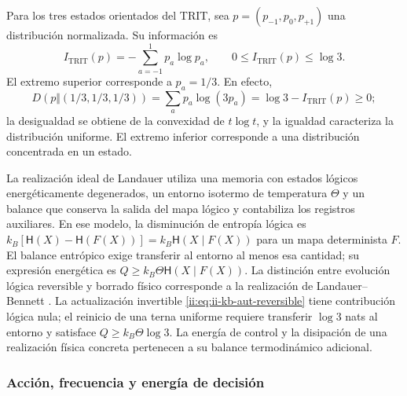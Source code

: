 Para los tres estados orientados del TRIT, sea
\(p=(p_{-1},p_0,p_{+1})\) una distribución normalizada. Su información es
\begin{equation}
 I_{\mathrm{TRIT}}(p)=-\sum_{a=-1}^{1}p_a\log p_a,
 \qquad 0\leq I_{\mathrm{TRIT}}(p)\leq\log3.
 \label{ii:eq:ii-kb-aut-trit}
\end{equation}
El extremo superior corresponde a \(p_a=1/3\). En efecto,
\[
 D(p\Vert(1/3,1/3,1/3))
 =\sum_ap_a\log(3p_a)=\log3-I_{\mathrm{TRIT}}(p)\geq0;
\]
la desigualdad se obtiene de la convexidad de \(t\log t\), y la
igualdad caracteriza la distribución uniforme. El extremo inferior
corresponde a una distribución concentrada en un estado.

La realización ideal de Landauer utiliza una memoria con estados lógicos
energéticamente degenerados, un entorno isotermo de temperatura \(\Theta\)
y un balance que conserva la salida del mapa lógico y contabiliza los
registros auxiliares. En ese modelo, la disminución de entropía lógica es
\(k_B[\mathsf H(X)-\mathsf H(F(X))]
=k_B\mathsf H(X\mid F(X))\) para un mapa determinista \(F\).
El balance entrópico exige transferir al entorno al menos esa cantidad;
su expresión energética es \(Q\geq k_B\Theta\mathsf H(X\mid F(X))\).
La distinción entre evolución lógica reversible y borrado físico
corresponde a la realización de Landauer--Bennett \cite{ii:bennett2003}.
La actualización invertible
\eqref{ii:eq:ii-kb-aut-reversible} tiene contribución lógica nula; el
reinicio de una terna uniforme requiere transferir \(\log3\) nats
al entorno y satisface \(Q\geq k_B\Theta\log3\).
La energía de control y la disipación de una realización física
concreta pertenecen a su balance termodinámico adicional.

\subsubsection{Acción, frecuencia y energía de decisión}

